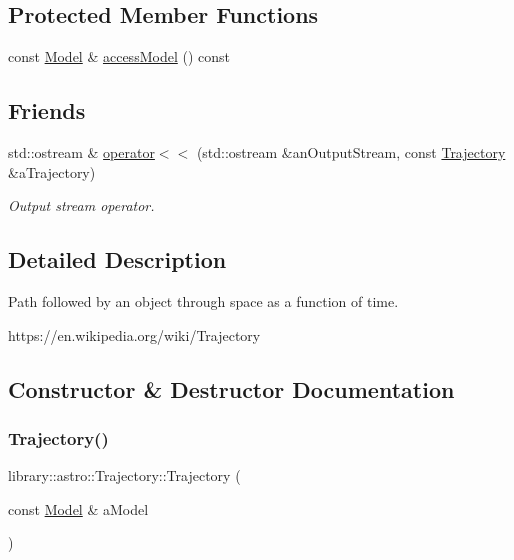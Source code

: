 \subsection*{Protected Member Functions}
\begin{DoxyCompactItemize}
\item 
const \hyperlink{classlibrary_1_1astro_1_1trajectory_1_1_model}{Model} \& \hyperlink{classlibrary_1_1astro_1_1_trajectory_ac5ebd6f282b52bb3d7c74a79375025e1}{access\+Model} () const
\end{DoxyCompactItemize}
\subsection*{Friends}
\begin{DoxyCompactItemize}
\item 
std\+::ostream \& \hyperlink{classlibrary_1_1astro_1_1_trajectory_aef0327f0240dc2d71eca34dc287f88ea}{operator$<$$<$} (std\+::ostream \&an\+Output\+Stream, const \hyperlink{classlibrary_1_1astro_1_1_trajectory}{Trajectory} \&a\+Trajectory)
\begin{DoxyCompactList}\small\item\em Output stream operator. \end{DoxyCompactList}\end{DoxyCompactItemize}


\subsection{Detailed Description}
Path followed by an object through space as a function of time. 

https\+://en.wikipedia.\+org/wiki/\+Trajectory 

\subsection{Constructor \& Destructor Documentation}
\mbox{\label{classlibrary_1_1astro_1_1_trajectory_a8e5c7740915ca947e067c0f419ac1c65}} 
\subsubsection{\texorpdfstring{Trajectory()}{Trajectory()}\hspace{0.1cm}{\footnotesize\ttfamily [1/3]}}
{\footnotesize\ttfamily library\+::astro\+::\+Trajectory\+::\+Trajectory (\begin{DoxyParamCaption}\item[{const \hyperlink{classlibrary_1_1astro_1_1trajectory_1_1_model}{Model} \&}]{a\+Model }\end{DoxyParamCaption})}



